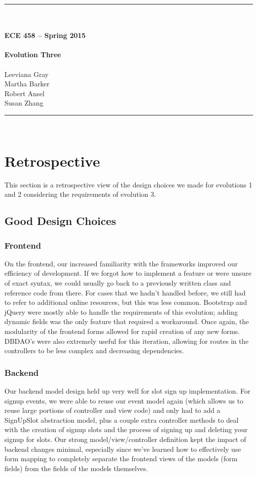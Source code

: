 \documentclass{article}
\begin{document}
\begin{center}
\rule{6.5in}{0.5mm}\\~\\
{\bf \large ECE 458 -- Spring 2015}\\~\\  
{\huge \bf Evolution Three}\\~\\
Leeviana Gray\\
Martha Barker\\
Robert Ansel\\
Susan Zhang\\
\rule{6.5in}{0.5mm}\\
\end{center}
\tableofcontents
\pagebreak

\section{Retrospective}
This section is a retrospective view of the design choices we made for evolutions 1 and 2 considering the requirements of evolution 3.

\subsection{Good Design Choices}
\subsubsection{Frontend}
On the frontend, our increased familiarity with the frameworks improved our efficiency of development. If we forgot how to implement a feature or were unsure of exact syntax, we could usually go back to a previously written class and reference code from there. For cases that we hadn’t handled before, we still had to refer to additional online resources, but this was less common. Bootstrap and jQuery were mostly able to handle the requirements of this evolution; adding dynamic fields was the only feature that required a workaround. Once again, the modularity of the frontend forms allowed for rapid creation of any new forms. DBDAO’s were also extremely useful for this iteration, allowing for routes in the controllers to be less complex and decreasing dependencies.

\subsubsection{Backend}
Our backend model design held up very well for slot sign up implementation. For signup events, we were able to reuse our event model again (which allows us to reuse large portions of controller and view code) and only had to add a SignUpSlot abstraction model, plus a couple extra controller methods to deal with the creation of signup slots and the process of signing up and deleting your signup for slots. Our strong model/view/controller definition kept the impact of backend changes minimal, especially since we've learned how to effectively use form mapping to completely separate the frontend views of the models (form fields) from the fields of the models themselves.
\end{document}
